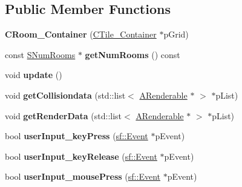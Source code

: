 \subsection*{Public Member Functions}
\begin{DoxyCompactItemize}
\item 
\hypertarget{classCRoom__Container_a8ff9ed6e36687810fa9d3e75f8be311e}{{\bfseries C\-Room\-\_\-\-Container} (\hyperlink{classCTile__Container}{C\-Tile\-\_\-\-Container} $\ast$p\-Grid)}\label{classCRoom__Container_a8ff9ed6e36687810fa9d3e75f8be311e}

\item 
\hypertarget{classCRoom__Container_a4487394b5b73570abf3731200129e507}{const \hyperlink{structSNumRooms}{S\-Num\-Rooms} $\ast$ {\bfseries get\-Num\-Rooms} () const }\label{classCRoom__Container_a4487394b5b73570abf3731200129e507}

\item 
\hypertarget{classCRoom__Container_a976c43bd83d5416c3f3d286d09ebf89d}{void {\bfseries update} ()}\label{classCRoom__Container_a976c43bd83d5416c3f3d286d09ebf89d}

\item 
\hypertarget{classCRoom__Container_a3aba6f3bd0674392426bb68b07f3bd2f}{void {\bfseries get\-Collisiondata} (std\-::list$<$ \hyperlink{classARenderable}{A\-Renderable} $\ast$ $>$ $\ast$p\-List)}\label{classCRoom__Container_a3aba6f3bd0674392426bb68b07f3bd2f}

\item 
\hypertarget{classCRoom__Container_a15cce22d7e258ca05eaa0605263bd743}{void {\bfseries get\-Render\-Data} (std\-::list$<$ \hyperlink{classARenderable}{A\-Renderable} $\ast$ $>$ $\ast$p\-List)}\label{classCRoom__Container_a15cce22d7e258ca05eaa0605263bd743}

\item 
\hypertarget{classCRoom__Container_aa220dc3fd30384ef9d3b13b0f7c0a417}{bool {\bfseries user\-Input\-\_\-key\-Press} (\hyperlink{classsf_1_1Event}{sf\-::\-Event} $\ast$p\-Event)}\label{classCRoom__Container_aa220dc3fd30384ef9d3b13b0f7c0a417}

\item 
\hypertarget{classCRoom__Container_a85bb9fcebc84e71bb90fb5c7d7c201a6}{bool {\bfseries user\-Input\-\_\-key\-Release} (\hyperlink{classsf_1_1Event}{sf\-::\-Event} $\ast$p\-Event)}\label{classCRoom__Container_a85bb9fcebc84e71bb90fb5c7d7c201a6}

\item 
\hypertarget{classCRoom__Container_a84080540b5cb7a400662aba47fee60fc}{bool {\bfseries user\-Input\-\_\-mouse\-Press} (\hyperlink{classsf_1_1Event}{sf\-::\-Event} $\ast$p\-Event)}\label{classCRoom__Container_a84080540b5cb7a400662aba47fee60fc}


\end{DoxyCompactItemize}

